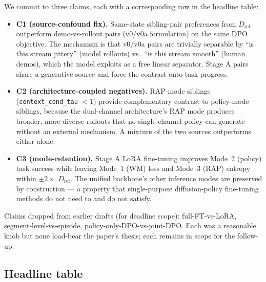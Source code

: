 \documentclass[11pt]{article}
\newcommand{\Dref}{D_{\mathrm{ref}}}
\begin{document}
We commit to three claims, each with a corresponding row in the headline table:
\begin{itemize}
    \item \textbf{C1 (source-confound fix).} Same-state sibling-pair preferences from $\Dref$ outperform demo-vs-rollout pairs (v0/v0a formulation) on the same DPO objective. The mechanism is that v0/v0a pairs are trivially separable by ``is this stream jittery'' (model rollouts) vs.\ ``is this stream smooth'' (human demos), which the model exploits as a free linear separator. Stage A pairs share a generative source and force the contrast onto task progress.
    \item \textbf{C2 (architecture-coupled negatives).} RAP-mode siblings (\texttt{context\_cond\_tau} $<1$) provide complementary contrast to policy-mode siblings, because the dual-channel architecture's RAP mode produces broader, more diverse rollouts that no single-channel policy can generate without an external mechanism. A mixture of the two sources outperforms either alone.
    \item \textbf{C3 (mode-retention).} Stage A LoRA fine-tuning improves Mode~2 (policy) task success while leaving Mode~1 (WM) loss and Mode~3 (RAP) entropy within $\pm 2\times$ $\Dref$. The unified backbone's other inference modes are preserved by construction --- a property that single-purpose diffusion-policy fine-tuning methods do not need to and do not satisfy.
\end{itemize}

Claims dropped from earlier drafts (for deadline scope): full-FT-vs-LoRA, segment-level-vs-episode, policy-only-DPO-vs-joint-DPO. Each was a reasonable knob but none load-bear the paper's thesis; each remains in scope for the follow-up.

\subsection{Headline table}
\label{sec:headline}
\end{document}
